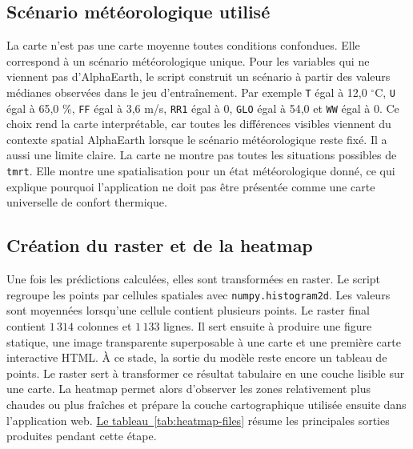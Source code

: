 \documentclass{article}
\begin{document}
\subsection{Scénario météorologique utilisé}

La carte n'est pas une carte moyenne toutes conditions confondues. Elle correspond à un scénario météorologique unique. Pour les variables qui ne viennent pas d'AlphaEarth, le script construit un scénario à partir des valeurs médianes observées dans le jeu d'entraînement. Par exemple \texttt{T} égal à 12,0 \(^{\circ}\mathrm{C}\), \texttt{U} égal à 65,0 \%, \texttt{FF} égal à 3,6 m/s, \texttt{RR1} égal à 0, \texttt{GLO} égal à 54,0 et \texttt{WW} égal à 0.
Ce choix rend la carte interprétable, car toutes les différences visibles viennent du contexte spatial AlphaEarth lorsque le scénario météorologique reste fixé. Il a aussi une limite claire. La carte ne montre pas toutes les situations possibles de \texttt{tmrt}. Elle montre une spatialisation pour un état météorologique donné, ce qui explique pourquoi l'application ne doit pas être présentée comme une carte universelle de confort thermique.

\subsection{Création du raster et de la heatmap}

Une fois les prédictions calculées, elles sont transformées en raster. Le script regroupe les points par cellules spatiales avec \texttt{numpy.histogram2d}. Les valeurs sont moyennées lorsqu'une cellule contient plusieurs points. Le raster final contient \(1\,314\) colonnes et \(1\,133\) lignes. Il sert ensuite à produire une figure statique, une image transparente superposable à une carte et une première carte interactive HTML.
À ce stade, la sortie du modèle reste encore un tableau de points. Le raster sert à transformer ce résultat tabulaire en une couche lisible sur une carte. La heatmap permet alors d'observer les zones relativement plus chaudes ou plus fraîches et prépare la couche cartographique utilisée ensuite dans l'application web.
\hyperref[tab:heatmap-files]{Le tableau~\ref{tab:heatmap-files}} résume les principales sorties produites pendant cette étape.
\end{document}

